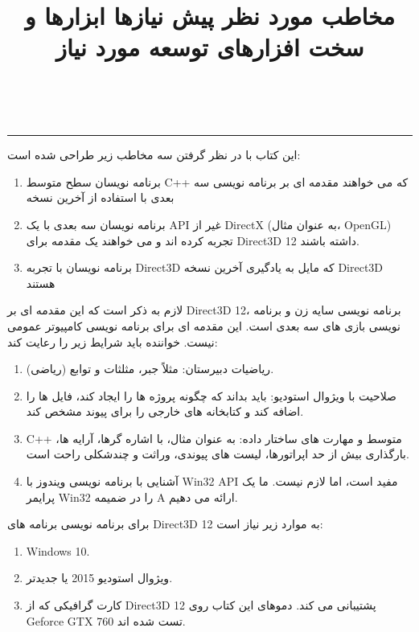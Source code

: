 \title{
    \LARGE
    مخاطب مورد نظر
}
\\ \rule{\textwidth}{0.5pt}
{این کتاب با در نظر گرفتن سه مخاطب زیر طراحی شده است:}
\begin{enumerate}
    \item {برنامه نویسان سطح متوسط C++ که می خواهند مقدمه ای بر برنامه نویسی سه بعدی با استفاده از آخرین نسخه}
    \item {برنامه نویسان سه بعدی با یک API غیر از DirectX (به عنوان مثال، OpenGL) تجربه کرده اند و می خواهند یک مقدمه برای Direct3D 12 داشته باشند.}
    \item {برنامه نویسان با تجربه Direct3D که مایل به یادگیری آخرین نسخه Direct3D هستند}
\end{enumerate}

\title{
    \LARGE
    پیش نیازها
}
{لازم به ذکر است که این مقدمه ای بر Direct3D 12، برنامه نویسی سایه زن و برنامه نویسی بازی های سه بعدی است. این مقدمه ای برای برنامه نویسی کامپیوتر عمومی نیست. خواننده باید شرایط زیر را رعایت کند:}

\begin{enumerate}
    \item {ریاضیات دبیرستان: مثلاً جبر، مثلثات و توابع (ریاضی).}
    \item {صلاحیت با ویژوال استودیو: باید بداند که چگونه پروژه ها را ایجاد کند، فایل ها را اضافه کند و کتابخانه های خارجی را برای پیوند مشخص کند.}
    \item {C++ متوسط و مهارت های ساختار داده: به عنوان مثال، با اشاره گرها، آرایه ها، بارگذاری بیش از حد اپراتورها، لیست های پیوندی، وراثت و چندشکلی راحت است.}
    \item {آشنایی با برنامه نویسی ویندوز با Win32 API مفید است، اما لازم نیست. ما یک پرایمر Win32 را در ضمیمه A ارائه می دهیم.}
\end{enumerate}

\title{
    \LARGE
    ابزارها و سخت افزارهای توسعه مورد نیاز
}
{برای برنامه نویسی برنامه های Direct3D 12 به موارد زیر نیاز است:}
\begin{enumerate}
    \item {Windows 10.}
    \item {ویژوال استودیو 2015 یا جدیدتر.}
    \item {کارت گرافیکی که از Direct3D 12 پشتیبانی می کند. دموهای این کتاب روی Geforce GTX 760 تست شده اند.}
\end{enumerate}

\newpage
